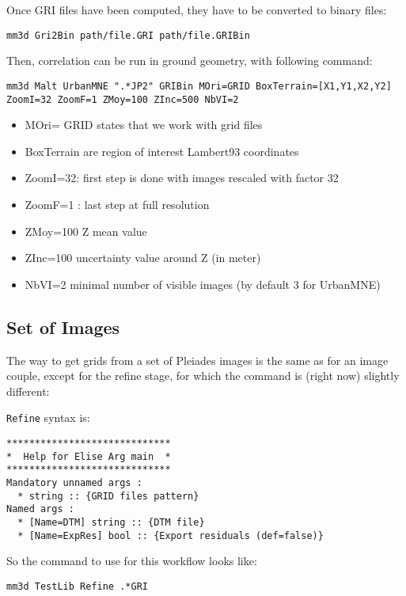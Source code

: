 Once GRI files have been computed, they have to be converted to binary files:
\begin{verbatim}
mm3d Gri2Bin path/file.GRI path/file.GRIBin
\end{verbatim}

Then, correlation can be run in ground geometry, with following command:

\begin{verbatim}
mm3d Malt UrbanMNE ".*JP2" GRIBin MOri=GRID BoxTerrain=[X1,Y1,X2,Y2]
ZoomI=32 ZoomF=1 ZMoy=100 ZInc=500 NbVI=2
\end{verbatim}

\begin{itemize}
 \item MOri= GRID states that we work with grid files
 \item   BoxTerrain are region of interest Lambert93 coordinates
 \item   ZoomI=32: first step is done with images rescaled with factor 32
 \item   ZoomF=1 : last step at full resolution
 \item   ZMoy=100  Z mean value
 \item   ZInc=100 uncertainty value around Z (in meter)
 \item   NbVI=2 minimal number of visible images  (by default 3 for UrbanMNE)
\end{itemize}

\subsection{Set of Images}

The way to get grids from a set of Pleiades images is the same as for an image couple, except for the refine stage, for which the command is (right now) slightly different:

{\tt Refine} syntax is:

\begin{verbatim}
*****************************
*  Help for Elise Arg main  *
*****************************
Mandatory unnamed args :
  * string :: {GRID files pattern}
Named args :
  * [Name=DTM] string :: {DTM file}
  * [Name=ExpRes] bool :: {Export residuals (def=false)}
\end{verbatim}

So the command to use for this workflow looks like:
\begin{verbatim}
mm3d TestLib Refine .*GRI
\end{verbatim}

